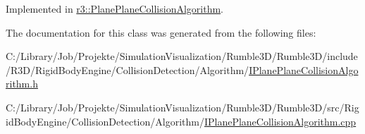Implemented in \mbox{\hyperlink{classr3_1_1_plane_plane_collision_algorithm_a33400ba57a8c0550ada0778bb92eeb69}{r3\+::\+Plane\+Plane\+Collision\+Algorithm}}.



The documentation for this class was generated from the following files\+:\begin{DoxyCompactItemize}
\item 
C\+:/\+Library/\+Job/\+Projekte/\+Simulation\+Visualization/\+Rumble3\+D/\+Rumble3\+D/include/\+R3\+D/\+Rigid\+Body\+Engine/\+Collision\+Detection/\+Algorithm/\mbox{\hyperlink{_i_plane_plane_collision_algorithm_8h}{I\+Plane\+Plane\+Collision\+Algorithm.\+h}}\item 
C\+:/\+Library/\+Job/\+Projekte/\+Simulation\+Visualization/\+Rumble3\+D/\+Rumble3\+D/src/\+Rigid\+Body\+Engine/\+Collision\+Detection/\+Algorithm/\mbox{\hyperlink{_i_plane_plane_collision_algorithm_8cpp}{I\+Plane\+Plane\+Collision\+Algorithm.\+cpp}}\end{DoxyCompactItemize}
